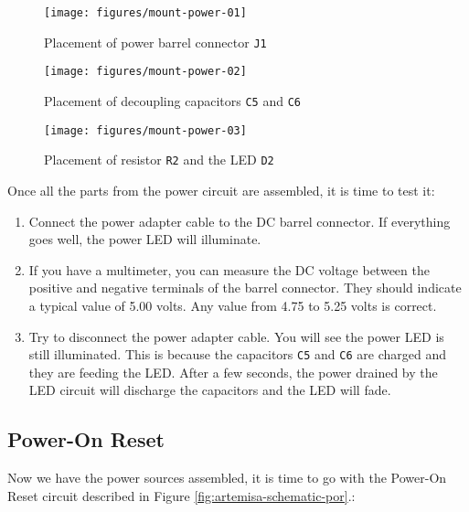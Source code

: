 \begin{figure}[htbp]
  \centering
  \texttt{[image: figures/mount-power-01]}
  \caption{Placement of power barrel connector {\tt J1}}
  \label{fig:mount-power-01}
\end{figure}

\begin{figure}[htbp]
  \centering
  \texttt{[image: figures/mount-power-02]}
  \caption{Placement of decoupling capacitors {\tt C5} and {\tt C6}}
  \label{fig:mount-power-02}
\end{figure}

\begin{figure}[htbp]
  \centering
  \texttt{[image: figures/mount-power-03]}
  \caption{Placement of resistor {\tt R2} and the LED {\tt D2}}
  \label{fig:mount-power-03}
\end{figure}

Once all the parts from the power circuit are assembled, it is time to test it:

\begin{enumerate}
  \item Connect the power adapter cable to the DC barrel connector. If everything goes well, the power LED will illuminate.
  \item If you have a multimeter, you can measure the DC voltage between the positive and negative terminals of the barrel connector. They should indicate a typical value of 5.00 volts. Any value from 4.75 to 5.25 volts is correct.
  \item Try to disconnect the power adapter cable. You will see the power LED is still illuminated. This is because the capacitors {\tt C5} and {\tt C6} are charged and they are feeding the LED. After a few seconds, the power drained by the LED circuit will discharge the capacitors and the LED will fade.
\end{enumerate}

\subsection{Power-On Reset}

Now we have the power sources assembled, it is time to go with the Power-On Reset circuit described in Figure \ref{fig:artemisa-schematic-por}.:

